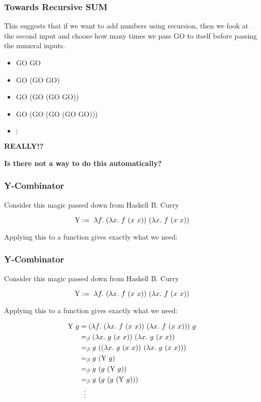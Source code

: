 \documentclass{beamer}
\begin{document}
\begin{frame}
	\frametitle{Towards Recursive SUM}

	This suggests that if we want to add numbers using recursion, then we look at the second input and choose how many times we pass GO to itself before passing the numeral inputs. 

	\begin{itemize}
		\item[] GO GO
		\item[] GO (GO GO)
		\item[] GO (GO (GO GO))
		\item[] GO (GO (GO (GO GO)))
		\item[] $\vdots$
	\end{itemize}

	{\bf REALLY!?}

	{\bf Is there not a way to do this automatically?}

\end{frame}

\begin{frame}
	\frametitle{Y-Combinator}

	Consider this magic passed down from Haskell B. Curry

	$$\text{Y}:= \ \lambda f. \ (\lambda x. \ f \ (x \ x)) \ (\lambda x. \ f \ (x \ x))$$

	Applying this to a function gives exactly what we need:

	\vspace{4cm}

\end{frame}

\begin{frame}
	\frametitle{Y-Combinator}

	Consider this magic passed down from Haskell B. Curry

	$$\text{Y}:= \ \lambda f. \ (\lambda x. \ f \ (x \ x)) \ (\lambda x. \ f \ (x \ x))$$

	Applying this to a function gives exactly what we need:

	\begin{align*}
		\YCOMB \ g &= (\lambda f. \ (\lambda x. \ f \ (x \ x)) \ (\lambda x. \ f \ (x \ x))) \ g \\
		&\beq (\lambda x. \ g \ (x \ x)) \ (\lambda x. \ g \ (x \ x)) \\
		&\beq g \ ((\lambda x. \ g \ (x \ x)) \ (\lambda x. \ g \ (x \ x))) \\
		&\beq g \ (\YCOMB \ g)\\
		&\beq g \ (g \ (\YCOMB \ g))\\
		&\beq g \ (g \ (g \ (\YCOMB \ g)))\\
		&\ \ \vdots
	\end{align*}

\end{frame}
\end{document}
